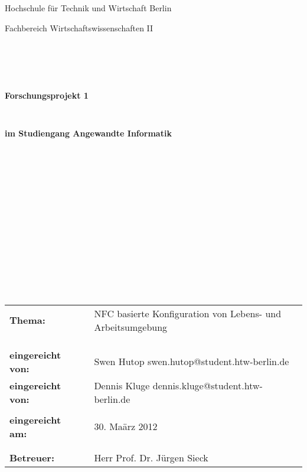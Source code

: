 \thispagestyle{empty}
\begin{center}
\Large{Hochschule für Technik und Wirtschaft Berlin}\\
\end{center}


\begin{center}
\Large{Fachbereich Wirtschaftswissenschaften II}
\end{center}
\begin{verbatim}





\end{verbatim}
\begin{center}
\textbf{\LARGE{Forschungsprojekt 1}}
\end{center}
\begin{verbatim}


\end{verbatim}
\begin{center}
\textbf{im Studiengang Angewandte Informatik}
\end{center}
\begin{verbatim}
















\end{verbatim}

\begin{flushleft}
\begin{tabular}{lll}
\textbf{Thema:} & & NFC basierte Konfiguration von Lebens- und Arbeitsumgebung\\
& & \\
& & \\
& & \\
\textbf{eingereicht von:} & & Swen Hutop  \flq{}swen.hutop@student.htw-berlin.de\frq{}\\
\textbf{eingereicht von:} & & Dennis Kluge  \flq{}dennis.kluge@student.htw-berlin.de\frq{}\\
& & \\
\textbf{eingereicht am:} & & 30. Maärz 2012\\
& & \\
& & \\
\textbf{Betreuer:} & & Herr Prof. Dr. Jürgen Sieck \\
\end{tabular}
\end{flushleft}

